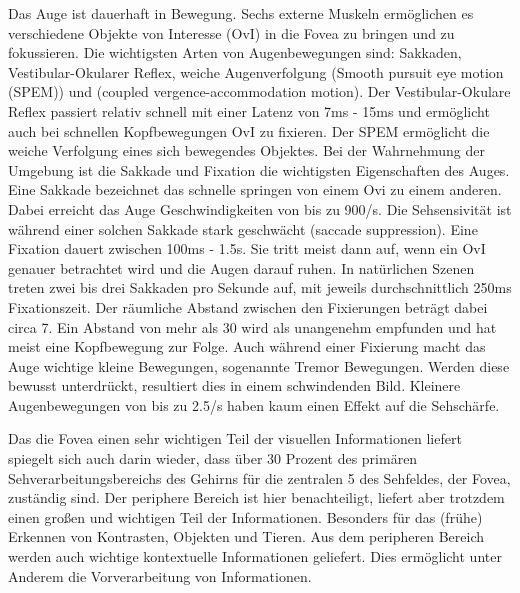 Das Auge ist dauerhaft in Bewegung.
Sechs externe Muskeln ermöglichen es verschiedene Objekte von Interesse (OvI) in die Fovea zu bringen und zu fokussieren.
Die wichtigsten Arten von Augenbewegungen sind: Sakkaden, Vestibular-Okularer Reflex, weiche Augenverfolgung (Smooth pursuit eye motion (SPEM)) und (coupled vergence-accommodation motion).
Der Vestibular-Okulare Reflex passiert relativ schnell mit einer Latenz von 7ms - 15ms und ermöglicht auch bei schnellen Kopfbewegungen OvI zu fixieren.
Der SPEM ermöglicht die weiche Verfolgung eines sich bewegendes Objektes.
Bei der Wahrnehmung der Umgebung ist die Sakkade und Fixation die wichtigsten Eigenschaften des Auges.
Eine Sakkade bezeichnet das schnelle springen von einem Ovi zu einem anderen.
Dabei erreicht das Auge Geschwindigkeiten von bis zu 900\textdegree/s.
Die Sehsensivität ist während einer solchen Sakkade stark geschwächt (saccade suppression).
Eine Fixation dauert zwischen 100ms - 1.5s.
Sie tritt meist dann auf, wenn ein OvI genauer betrachtet wird und die Augen darauf ruhen.
In natürlichen Szenen treten zwei bis drei Sakkaden pro Sekunde auf, mit jeweils durchschnittlich 250ms Fixationszeit.
Der räumliche Abstand zwischen den Fixierungen beträgt dabei circa 7\textdegree{}.
Ein Abstand von mehr als 30\textdegree{} wird als unangenehm empfunden und hat meist eine Kopfbewegung zur Folge.
Auch während einer Fixierung macht das Auge wichtige kleine Bewegungen, sogenannte Tremor Bewegungen.
Werden diese bewusst unterdrückt, resultiert dies in einem schwindenden Bild.
Kleinere Augenbewegungen von bis zu 2.5\textdegree{}/s haben kaum einen Effekt auf die Sehschärfe.

Das die Fovea einen sehr wichtigen Teil der visuellen Informationen liefert spiegelt sich auch darin wieder, dass über 30 Prozent des primären Sehverarbeitungsbereichs des Gehirns für die zentralen 5\textdegree{} des Sehfeldes, der Fovea, zuständig sind.
Der periphere Bereich ist hier benachteiligt, liefert aber trotzdem einen großen und wichtigen Teil der Informationen.
Besonders für das (frühe) Erkennen von Kontrasten, Objekten und Tieren.
Aus dem peripheren Bereich werden auch wichtige kontextuelle Informationen geliefert.
Dies ermöglicht unter Anderem die Vorverarbeitung von Informationen.

